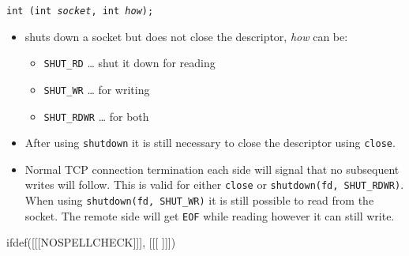 \begin{slide}
\texttt{int (int \emph{socket}, int \emph{how});}
\begin{itemize}
\item shuts down a socket but does not close the descriptor, \emph{how} can be: 
    \begin{itemize}
    \item \texttt{SHUT\_RD} \dots{} shut it down for reading
    \item \texttt{SHUT\_WR} \dots{} for writing
    \item \texttt{SHUT\_RDWR} \dots{} for both
    \end{itemize}
\end{itemize}
\end{slide}

\begin{itemize}
\item After using \texttt{shutdown} it is still necessary to close the
descriptor using \texttt{close}.
\item Normal TCP connection termination each side will signal that no subsequent
writes will follow. This is valid for either \texttt{close} or
\texttt{shutdown(fd, SHUT\_RDWR)}. When using
\texttt{shutdown(fd, SHUT\_WR)} it is still possible to read from the socket.
The remote side will get \texttt{EOF} while reading however it can still write.
\end{itemize}


ifdef([[[NOSPELLCHECK]]], [[[
]]])

